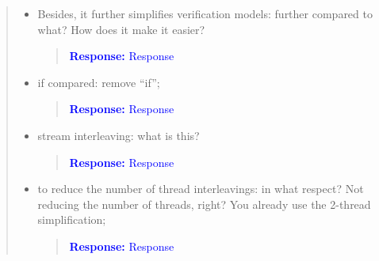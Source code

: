\documentclass[11pt]{article}
\begin{document}
\begin{quote}
\begin{itemize}
\begin{itemize}
  \item Besides, it further simplifies verification models: further compared to what? How does it make it easier?
  
    \begin{quote}
    \textcolor{blue}{\textbf{Response:} Response}
    \end{quote}

  \item if compared: remove ``if'';
  
    \begin{quote}
    \textcolor{blue}{\textbf{Response:} Response}
    \end{quote}

  \item stream interleaving: what is this?
  
    \begin{quote}
    \textcolor{blue}{\textbf{Response:} Response}
    \end{quote}

  \item  to reduce the number of thread interleavings: in what respect? Not reducing the number of threads, right? You already use the 2-thread simplification;
  
    \begin{quote}
    \textcolor{blue}{\textbf{Response:} Response}
    \end{quote}

  \end{itemize}
\end{itemize}

\end{quote}

\label{LastPage}

\end{document}
